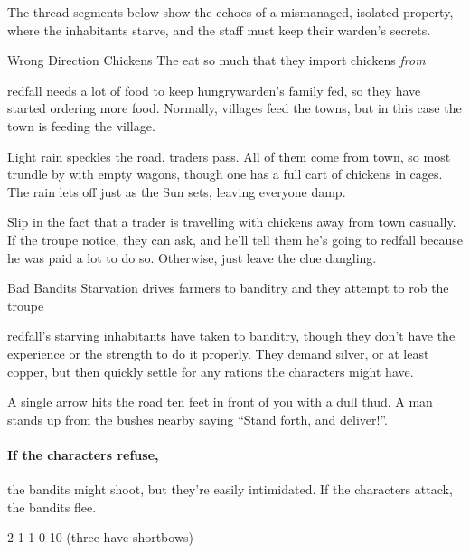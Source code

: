 The \gls{thread} \glspl{segment} below show the echoes of a mismanaged, isolated property, where the inhabitants starve, and the staff must keep their \gls{warden}'s secrets.

{Wrong Direction Chickens}%
{The   eat so much that they import chickens \emph{from} }%

\Gls{redfall} needs a lot of food to keep \gls{hungrywarden}'s family fed, so they have started ordering more food.
Normally, \glspl{village} feed the towns, but in this case the town is feeding the \gls{village}.

\begin{boxtext}
  Light rain speckles the road, traders pass.
  All of them come from \gls{town}, so most trundle by with empty wagons, though one has a full cart of chickens in cages.
  The rain lets off just as the Sun sets, leaving everyone damp.
\end{boxtext}

Slip in the fact that a trader is travelling with chickens away from \gls{town} casually.
If the troupe notice, they can ask, and he'll tell them he's going to \gls{redfall} because he was paid a lot to do so.
Otherwise, just leave the clue dangling.

{Bad Bandits}%
{Starvation drives  farmers to banditry and they attempt to rob the troupe}%

\Gls{redfall}'s starving inhabitants have taken to banditry, though they don't have the experience or the strength to do it properly.
They demand silver, or at least copper, but then quickly settle for any \glspl{ration} the characters might have.

\begin{boxtext}
  A single arrow hits the road ten feet in front of you with a dull thud.
  A man stands up from the bushes nearby saying ``Stand forth, and deliver!''.
\end{boxtext}

\paragraph{If the characters refuse,}
the bandits might shoot, but they're easily intimidated.
If the characters attack, the bandits flee.

%
  {{2}{-1}{-1}}%
  {{0}{-1}{0}}%
  {%
    \Dagger
  }%
  {}%
  {(three have shortbows)}%
  {}%

